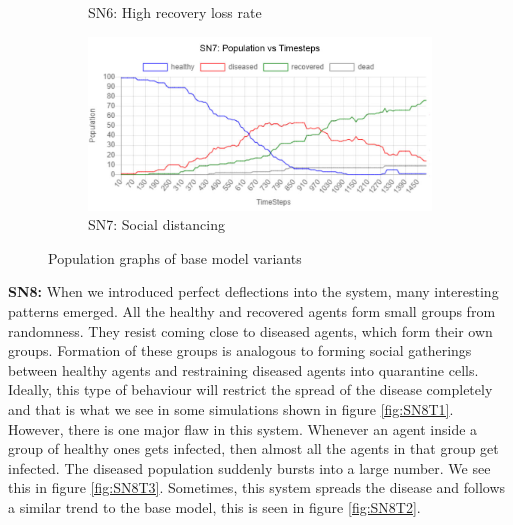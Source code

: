 \documentclass[a4paper,11pt]{article}
\begin{document}
\begin{figure}[H]
\begin{subfigure}[b]{0.49\linewidth}
            \caption{SN6:  High recovery loss rate}
            \label{fig:SN6}
        \end{subfigure}
        \begin{subfigure}[b]{0.49\linewidth}
            \includegraphics[width=\linewidth]{pop_graphs/SN7_pop.jpg}
            \caption{SN7:  Social distancing}
            \label{fig:SN7}
        \end{subfigure}
        \caption{Population graphs of base model variants}
    \end{figure}

    {\bf SN8:} When we introduced perfect deflections into the system, many interesting patterns emerged. All the healthy and recovered agents form small groups from randomness. They resist coming close to diseased agents, which form their own groups. Formation of these groups is analogous to forming social gatherings between healthy agents and restraining diseased agents into quarantine cells. Ideally, this type of behaviour will restrict the spread of the disease completely and that is what we see in some simulations shown in figure \ref{fig:SN8T1}. However, there is one major flaw in this system. Whenever an agent inside a group of healthy ones gets infected, then almost all the agents in that group get infected. The diseased population suddenly bursts into a large number. We see this in figure \ref{fig:SN8T3}. Sometimes, this system spreads the disease and follows a similar trend to the base model, this is seen in figure \ref{fig:SN8T2}.
\end{document}

